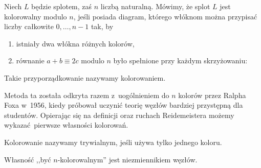 \begin{definition}[kolorowanie]
    \label{def:colour_equation}
    Niech $L$ będzie splotem, zaś $n$ liczbą naturalną.
    Mówimy, że splot $L$ jest kolorowalny modulo $n$, jeśli posiada diagram, którego włóknom można przypisać liczby całkowite $0, \ldots, n - 1$ tak, by
    \begin{enumerate}[leftmargin=*]
        \item istniały dwa włókna różnych kolorów,
        \item równanie $a + b \equiv 2c$ modulo $n$ było spełnione przy każdym skrzyżowaniu:
    \end{enumerate}
\begin{comment}
    \[
        \begin{tikzpicture}[baseline=-0.65ex, scale=0.12]
            \useasboundingbox (-5, -5) rectangle (5,5);
            \begin{knot}[clip width=5, end tolerance=1pt, flip crossing/.list={1}]
                \strand[semithick] (-5,5) to (5,-5);
                \strand[semithick] (-5,-5) to (5,5);
                \node[darkblue] at (5, 5)[below right] {$c$};
                \node[darkblue] at (5, -5)[above right] {$b$};
                \node[darkblue] at (-5, 5)[below left] {$a$};
            \end{knot}
        \end{tikzpicture}.
    \]
\end{comment}
    Takie przyporządkowanie nazywamy kolorowaniem.
\end{definition}

Metoda ta została odkryta razem z~uogólnieniem do $n$ kolorów przez Ralpha Foxa w~1956, kiedy próbował uczynić teorię węzłów bardziej przystępną dla studentów.
Opierając się na definicji oraz ruchach Reidemeistera możemy wykazać pierwsze własności kolorowań.

Kolorowanie nazywamy trywialnym, jeśli używa tylko jednego koloru.

\begin{proposition} \label{color_invariant}
    Własność ,,być $n$-kolorowalnym'' jest niezmiennikiem węzłów.
\end{proposition}


